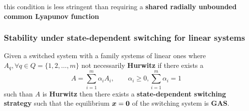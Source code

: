 \begin{nb}this condition is less stringent than requiring a \textbf{shared radially unbounded common Lyapunov function}\end{nb}

\subsubsection{Stability under state-dependent switching for linear systems}

\begin{theorem}
	Given a switched system with a family systems of linear ones where $A_q, \forall q \in Q = \{1,2,\dots,m\}$ not necessarily \textbf{Hurwitz} if there exists a
	\[
		A = \sum_{i=1}^m \alpha_i A_i, \qquad \alpha_i \geq 0, \sum_{i=1}^m \alpha_i =1
	\]
	such than $A$ is \textbf{Hurwitz} then there exists a \textbf{state-dependent switching strategy} such that the equilibrium $\boldsymbol{x}=\boldsymbol{0}$ of the switching system is \textbf{GAS}.
\end{theorem}